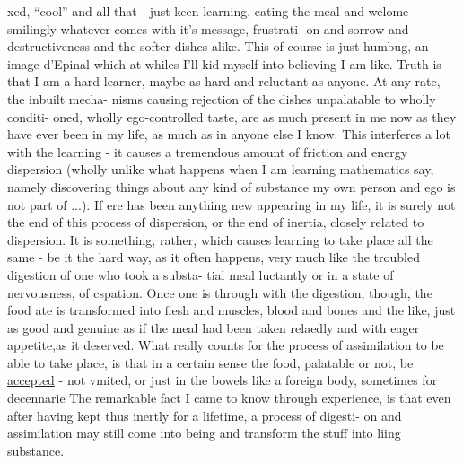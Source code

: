 
xed, ``cool'' and all that - just keen  learning,  eating the
meal and welome smilingly whatever comes with it's message, frustrati-%
on and sorrow and destructiveness and the softer dishes alike. This of
course is just humbug, an image d'Epinal which at whiles I'll kid 
myself into believing I am like. Truth is that I am a hard learner,
maybe as hard and reluctant as anyone. At any rate, the inbuilt mecha-%
nisms causing rejection of the dishes unpalatable to   wholly conditi-%
oned, wholly ego-controlled taste, are as much present in me now as
they have ever been in my life,  as much as in anyone else I know. This
interferes a lot with the learning - it causes a tremendous amount of
friction and energy dispersion (wholly unlike what happens when I am
learning mathematics say, namely discovering things about any kind of
substance   my own person and ego is not part of ...). If ere
has been anything new appearing in my life, it is surely not the end
of this process of dispersion, or the end of inertia, closely related
to dispersion. It is something, rather, which causes learning to take
place all the same - be it the hard way, as it often happens, very
much like the troubled digestion of one who took  a substa-%
tial meal luctantly or in a state of nervousness, of cspation.
Once  one is through with the digestion, though, the food   ate
is transformed into flesh and muscles, blood and bones and the like,
just as good and genuine as if the meal had been taken relaedly and
with eager appetite,\hand{|}as it deserved. What really counts for the process
of assimilation to be able to take place, is that in a certain sense
the food, palatable or not, be \uline{accepted} - not vmited, or just
  in the bowels like a foreign body, sometimes for decennarie
The remarkable fact I came to know through experience, is that even
after having  kept thus inertly for a lifetime, a process of digesti-%
on and assimilation may still come into being and transform the  stuff
into liing substance.

